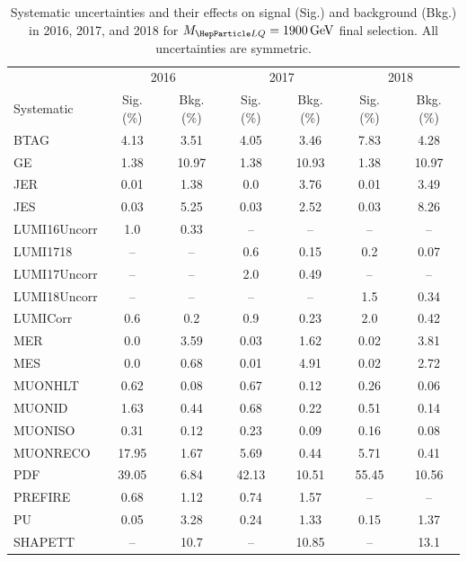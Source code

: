 \begin{table}[H]
	\begin{center}
        \begin{footnotesize}
			\caption{Systematic uncertainties and their effects on signal (Sig.) and background (Bkg.) in 2016, 2017, and 2018 for $\MLQ = \SI{1900}{GeV}$ final selection. All uncertainties are symmetric.}
			\begin{tabular}{lcccccc} \hline \hline
				& \multicolumn{2}{c}{2016} & \multicolumn{2}{c}{2017} & \multicolumn{2}{c}{2018} \\
				Systematic & Sig. (\%) & Bkg. (\%) & Sig. (\%) & Bkg. (\%) & Sig. (\%) & Bkg. (\%) \\ \hline
				BTAG &  4.13  &  3.51 &  4.05  &  3.46 &  7.83  &  4.28 \\
				GE &  1.38  &  10.97 &  1.38  &  10.93 &  1.38  &  10.97 \\
				JER &  0.01  &  1.38 &  0.0  &  3.76 &  0.01  &  3.49 \\
				JES &  0.03  &  5.25 &  0.03  &  2.52 &  0.03  &  8.26 \\
				LUMI16Uncorr &  1.0  &  0.33 & -- & -- & -- & -- \\
				LUMI1718 & -- & -- &  0.6  &  0.15 &  0.2  &  0.07 \\
				LUMI17Uncorr & -- & -- &  2.0  &  0.49 & -- & -- \\
				LUMI18Uncorr & -- & -- & -- & -- &  1.5  &  0.34 \\
				LUMICorr &  0.6  &  0.2 &  0.9  &  0.23 &  2.0  &  0.42 \\
				MER &  0.0  &  3.59 &  0.03  &  1.62 &  0.02  &  3.81 \\
				MES &  0.0  &  0.68 &  0.01  &  4.91 &  0.02  &  2.72 \\
				MUONHLT &  0.62  &  0.08 &  0.67  &  0.12 &  0.26  &  0.06 \\
				MUONID &  1.63  &  0.44 &  0.68  &  0.22 &  0.51  &  0.14 \\
				MUONISO &  0.31  &  0.12 &  0.23  &  0.09 &  0.16  &  0.08 \\
				MUONRECO &  17.95  &  1.67 &  5.69  &  0.44 &  5.71  &  0.41 \\
				PDF &  39.05  &  6.84 &  42.13  &  10.51 &  55.45  &  10.56 \\
				PREFIRE &  0.68  &  1.12 &  0.74  &  1.57 & -- & -- \\
				PU &  0.05  &  3.28 &  0.24  &  1.33 &  0.15  &  1.37 \\
				SHAPETT & -- &  10.7 & -- &  10.85 & -- &  13.1 \\

\end{tabular}
\end{footnotesize}
\end{center}
\end{table}

